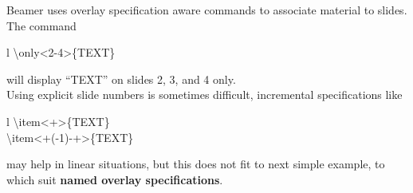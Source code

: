 Beamer uses overlay specification aware commands to associate material to slides. The command%
\begin{myCodeBox}{l}%
\backslash only<2-4>\{TEXT\}
\end{myCodeBox}%
%
will display ``TEXT'' on slides 2, 3, and 4 only.
\\[0.5\baselineskip]
Using explicit slide numbers is sometimes difficult, incremental specifications like%
\begin{myCodeBox}{l}%
\backslash item<+>\{TEXT\}\\
\backslash item<+(-1)-+>\{TEXT\}%
\end{myCodeBox}%
may help in linear situations, but this does not fit to next simple example,
to which suit \textbf{named overlay specifications}.
